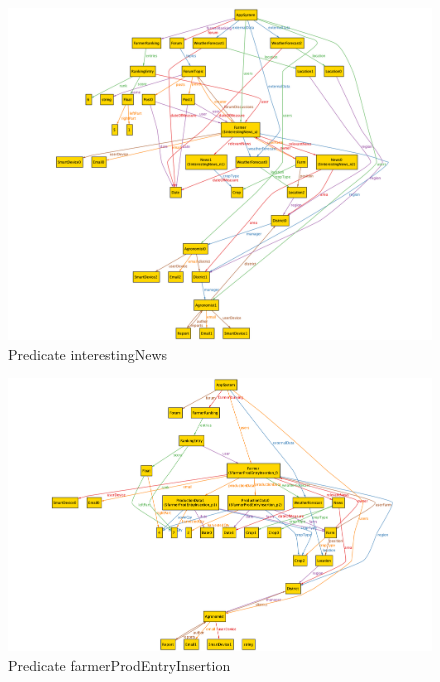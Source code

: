 \documentclass[table, 12pt]{article}
\begin{document}
\begin{center}
    \begin{figure}[H]
        \includegraphics[scale=0.40, center]{assets/AlloyInstances/interestingNews.png}
        \caption{Predicate interestingNews}
        \label{fig: interestingNews}
    \end{figure}
\end{center}

\begin{center}
    \begin{figure}[H]
        \includegraphics[scale=0.40, center]{assets/AlloyInstances/productionInsertion.png}
        \caption{Predicate farmerProdEntryInsertion}
        \label{fig: productionInsertion}
    \end{figure}
\end{center}
\end{document}
